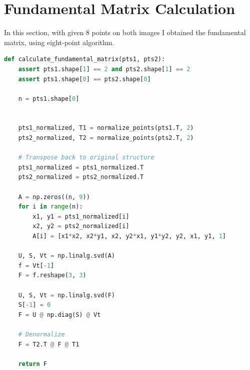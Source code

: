 \section*{Fundamental Matrix Calculation}
In this section, with given 8 points on both images I obtained the fundamental matrix, using eight-point algorithm.

\begin{lstlisting}[language=python]
def calculate_fundamental_matrix(pts1, pts2):
    assert pts1.shape[1] == 2 and pts2.shape[1] == 2
    assert pts1.shape[0] == pts2.shape[0]
    
    n = pts1.shape[0]
    
    
    pts1_normalized, T1 = normalize_points(pts1.T, 2)
    pts2_normalized, T2 = normalize_points(pts2.T, 2)
    
    # Transpose back to original structure
    pts1_normalized = pts1_normalized.T
    pts2_normalized = pts2_normalized.T
    
    A = np.zeros((n, 9))
    for i in range(n):
        x1, y1 = pts1_normalized[i]
        x2, y2 = pts2_normalized[i]
        A[i] = [x1*x2, x2*y1, x2, y2*x1, y1*y2, y2, x1, y1, 1]
    
    U, S, Vt = np.linalg.svd(A)
    f = Vt[-1]
    F = f.reshape(3, 3)
    
    U, S, Vt = np.linalg.svd(F)
    S[-1] = 0
    F = U @ np.diag(S) @ Vt
    
    # Denormalize
    F = T2.T @ F @ T1
    
    return F
\end{lstlisting}
